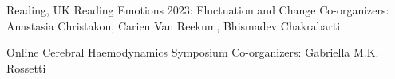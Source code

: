 

{Reading, UK}
{Reading Emotions 2023: Fluctuation and Change}
{Co-organizers: Anastasia Christakou, Carien Van Reekum, Bhismadev Chakrabarti}
\vspace{0.5em}

{Online}
{Cerebral Haemodynamics Symposium}
{Co-organizers: Gabriella M.K. Rossetti}